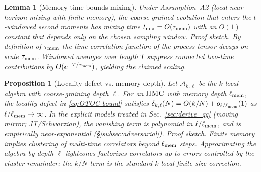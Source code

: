 \documentclass[11pt,a4paper]{article}
\newcommand{\HMC}{\textsc{HMC}\xspace}
\theoremstyle{plain}
\newtheorem{lemma}[theorem]{Lemma}
\newtheorem{proposition}[theorem]{Proposition}
\theoremstyle{definition}
\theoremstyle{remark}
\begin{document}
\begin{lemma}[Memory time bounds mixing]
\label{lem:mem-to-mix}
Under Assumption~A2 (local near-horizon mixing with finite memory), the coarse-grained evolution that enters the $t$-windowed second moments
has mixing time $t_{\rm mix}=O(\tau_{\rm mem})$ with an $O(1)$ constant that depends only on the chosen sampling window.
\emph{Proof sketch.} By definition of $\tau_{\rm mem}$ the time-correlation function of the process tensor decays on scale $\tau_{\rm mem}$.
Windowed averages over length $T$ suppress connected two-time contributions by $O(e^{-T/\tau_{\rm mem}})$, yielding the claimed scaling.
\end{lemma}

\begin{proposition}[Locality defect vs. memory depth]
\label{prop:delta-locality}
Let $\mathscr A_{k,\ell}$ be the $k$-local algebra with coarse-graining depth $\ell$. For an $\HMC{}$ with memory depth $\ell_{\rm mem}$,
the locality defect in \eqref{eq:OTOC-bound} satisfies $\delta_{k,\ell}(N)=O(k/N)+o_{\ell/\ell_{\rm mem}}(1)$ as $\ell/\ell_{\rm mem}\to\infty$.
In the explicit models treated in Sec.~\ref{sec:derive_qg} (moving mirror; JT/Schwarzian), the vanishing term is polynomial in $\ell/\ell_{\rm mem}$,
and is empirically near-exponential (\S\ref{subsec:adversarial}).
\emph{Proof sketch.} Finite memory implies clustering of multi-time correlators beyond $\ell_{\rm mem}$ steps.
Approximating the algebra by depth-$\ell$ lightcones factorizes correlators up to errors controlled by the cluster remainder;
the $k/N$ term is the standard $k$-local finite-size correction.
\end{proposition}
\end{document}
